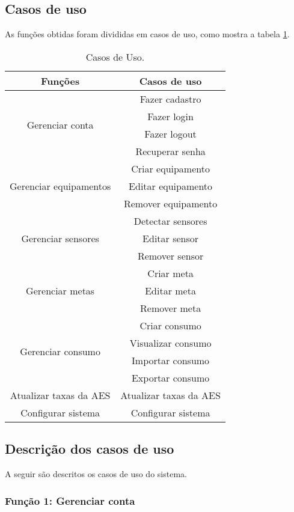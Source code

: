 \subsection{Casos de uso}
As funções obtidas foram divididas em casos de uso, como mostra a tabela \ref{tab:casos_de_uso}.
%
\begin{table}
\centering
{\renewcommand{\arraystretch}{1.5}
\renewcommand{\tabcolsep}{0.2cm}
\begin{tabular}{|c|c|}
\hline
\textbf{Funções} & \textbf{Casos de uso} \\
\hline
\multirow{4}{*}{Gerenciar conta} & Fazer cadastro\\
& Fazer login\\
& Fazer logout\\
& Recuperar senha\\
\hline
\multirow{3}{*}{Gerenciar equipamentos} & Criar equipamento\\
& Editar equipamento\\
& Remover equipamento\\
\hline
\multirow{3}{*}{Gerenciar sensores} & Detectar sensores\\
& Editar sensor\\
& Remover sensor\\
\hline
\multirow{3}{*}{Gerenciar metas} & Criar meta\\
& Editar meta\\
& Remover meta\\
\hline
\multirow{4}{*}{Gerenciar consumo} & Criar consumo\\
& Visualizar consumo\\
& Importar consumo\\
& Exportar consumo\\
\hline
Atualizar taxas da AES & Atualizar taxas da AES\\
\hline
Configurar sistema & Configurar sistema\\
\hline
\end{tabular}}
\caption{\label{tab:casos_de_uso} Casos de Uso.}
\end{table}
%
\subsection{Descrição dos casos de uso}
A seguir são descritos os casos de uso do sistema. 
%
\subsubsection{Função 1: Gerenciar conta}

